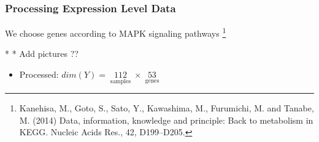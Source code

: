 \begin{frame}
    \frametitle{Processing Expression Level Data}

    We choose genes according to MAPK signaling pathways \footnote[2]{Kanehisa, M., Goto, S., Sato, Y., Kawashima, M., Furumichi, M. and Tanabe, M. (2014) Data, information, knowledge and principle: Back to metabolism in KEGG. Nucleic Acids Res., 42, D199–D205.}

    * * Add pictures ?? 
    \begin{itemize}
    \item Processed: $dim(Y)=\mathop{112}\limits_{\text{samples}}\times\mathop{53}\limits_{\text{genes}}$
    \end{itemize}
\end{frame}
